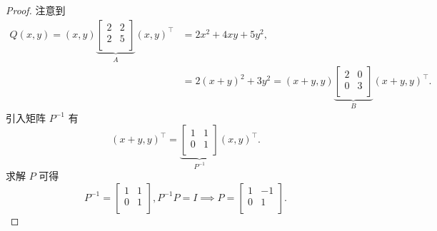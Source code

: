 \begin{proof}
注意到
\[
\begin{aligned}
    Q \left(x, y\right) = \left(x, y\right) \underbrace{\begin{bmatrix}
        2 & 2 \\
        2 & 5 \\
    \end{bmatrix}}_{A} \left(x, y\right)^\top &= 2x^2 + 4xy + 5y^2, \\
    &= 2 \left(x + y\right)^2 + 3 y^2 = \left(x + y, y\right) \underbrace{\begin{bmatrix}
        2 & 0 \\
        0 & 3 \\
    \end{bmatrix}}_{B} \left(x + y, y\right)^\top.
\end{aligned}
\]
引入矩阵 $P^{-1}$ 有
\[
\left(x + y, y\right)^\top = \underbrace{\begin{bmatrix}
    1 & 1 \\
    0 & 1 \\
\end{bmatrix}}_{P^{-1}} \left(x, y\right)^\top.
\]
求解 $P$ 可得
\[
P^{-1} = \begin{bmatrix}
    1 & 1 \\
    0 & 1 \\
\end{bmatrix}, P^{-1}P = I \implies
\boxed{P = \begin{bmatrix}
    1 & -1 \\
    0 & 1 \\
\end{bmatrix}}.
\]
\end{proof}
